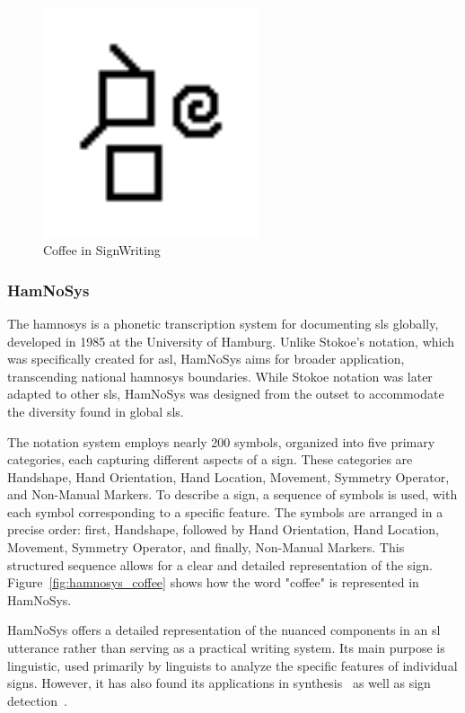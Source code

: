 \documentclass[../../main.tex]{subfiles}
\begin{document}
\begin{figure}[h]
  \centering \includegraphics[width = 2.5in]{chapters/background_work/images/signwriting_coffee.png}
  \caption{Coffee in SignWriting}
  \label{fig:signwriting_coffee}
\end{figure}

\subsubsection{HamNoSys}
\label{ch:background_work:sign_language_descriptions:lexical_approaches:hamnosys}

The \gls{hamnosys} is a phonetic transcription system for documenting \gls{sl}s globally, developed in 1985 at the University of Hamburg. Unlike Stokoe's notation, which was specifically created for \gls{asl}, HamNoSys aims for broader application, transcending national \gls{hamnosys} boundaries. While Stokoe notation was later adapted to other \gls{sl}s, HamNoSys was designed from the outset to accommodate the diversity found in global \gls{sl}s.

The notation system employs nearly 200 symbols, organized into five primary categories, each capturing different aspects of a sign. These categories are Handshape, Hand Orientation, Hand Location, Movement, Symmetry Operator, and Non-Manual Markers. To describe a sign, a sequence of symbols is used, with each symbol corresponding to a specific feature. The symbols are arranged in a precise order: first, Handshape, followed by Hand Orientation, Hand Location, Movement, Symmetry Operator, and finally, Non-Manual Markers. This structured sequence allows for a clear and detailed representation of the sign. Figure~\ref{fig:hamnosys_coffee} shows how the word "coffee" is represented in HamNoSys.

HamNoSys offers a detailed representation of the nuanced components in an \gls{sl} \gls{utterance} rather than serving as a practical writing system. Its main purpose is linguistic, used primarily by linguists to analyze the specific features of individual signs. However, it has also found its applications in synthesis~\cite{elliott2010towards} as well as sign detection~\cite{mocialov2022unsupervised}.
\end{document}
